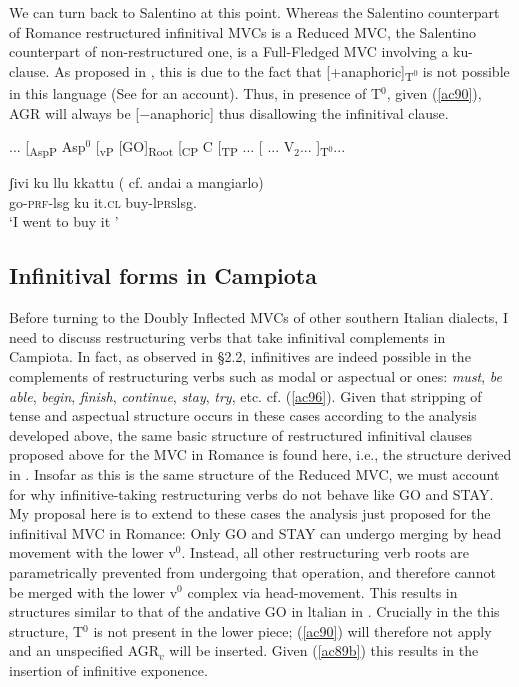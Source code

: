 \documentclass[output=paper]{langscibook}
\begin{document}
We can turn back to Salentino at this point. Whereas the Salentino counterpart of Romance restructured infinitival MVCs is a Reduced MVC, the Salentino counterpart of non-restructured one, is a Full-Fledged MVC involving a ku-clause.  As proposed in \cite{calabrese1993a}, this is due to the fact that [+anaphoric]\textsubscript{T$^0$} is not possible in this language (See \cite{calabrese1993a} for an account).  Thus, in presence of T$^0$, given (\ref{ac90}), AGR will always be [−anaphoric] thus disallowing the infinitival clause.

\ea\label{ac94}
 ... [\textsubscript{AspP} Asp$^0$ [\textsubscript{vP} [GO]\textsubscript{Root} [\textsubscript{CP} C [\textsubscript{TP} ... [ ... V$_2$... ]\textsubscript{T$^0$}...
\z

\ea \label{ac95} \gll  ʃivi  ku  llu kkattu ( cf. andai a mangiarlo)\\
  go-\textsc{prf}-lsg  ku  it.\textsc{cl} buy-l\textsc{prs}lsg. \\
 \glt ‘I went to buy it '
\z

\subsection{Infinitival forms in Campiota}

Before turning to the Doubly Inflected MVCs of other southern Italian dialects, I need to discuss restructuring verbs that take infinitival complements in Campiota. In fact, as observed in §2.2, infinitives are indeed possible in the complements of restructuring verbs such as modal or aspectual or ones: \textit{must},\textit{ be  able},  \textit{begin},  \textit{finish},  \textit{continue},  \textit{stay},  \textit{try}, etc. cf. (\ref{ac96}). Given that stripping of tense and aspectual structure occurs in these cases according to the analysis developed above, the same basic structure of restructured infinitival clauses proposed above for the MVC in Romance is found here, i.e., the structure derived in . Insofar as this is the same structure of the Reduced MVC, we must account for why infinitive-taking restructuring verbs do not behave like GO and STAY. My proposal here is to extend to these cases the analysis just proposed for the infinitival MVC in Romance: Only GO and STAY can undergo merging  by  head  movement  with  the  lower  v$^0$.  Instead, all other restructuring verb roots are parametrically prevented from undergoing that operation, and therefore cannot be merged with the lower v$^0$ complex via head-movement. This results in structures similar to that of the andative GO in ltalian in . Crucially in the this structure, T$^0$ is not present in the lower piece; (\ref{ac90}) will therefore not apply and an unspecified AGR$_v$ will be inserted.  Given (\ref{ac89b}) this results in the insertion of infinitive exponence.
\end{document}
